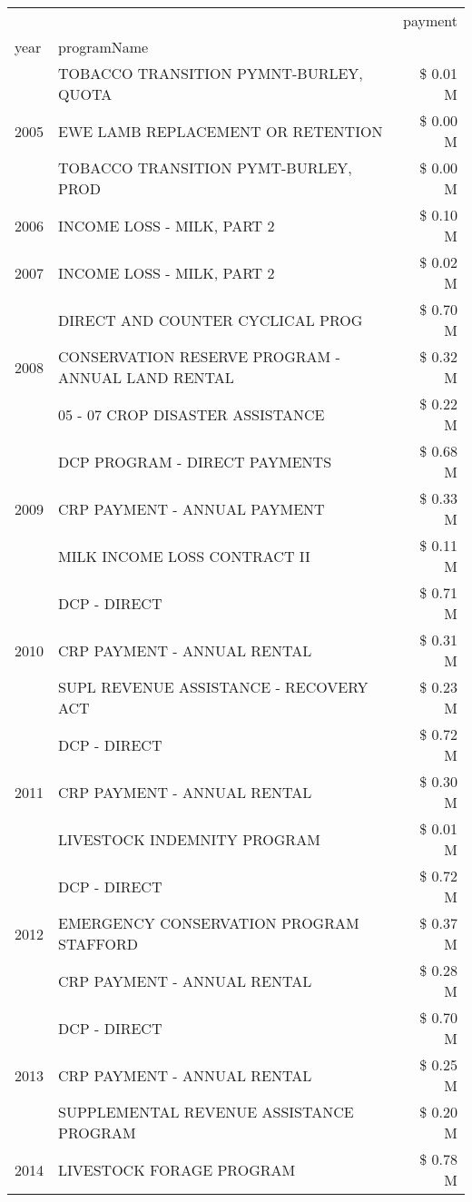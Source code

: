 \begin{tabular}{llr}
\toprule
 &  & payment \\
year & programName &  \\
\midrule
\multirow[t]{3}{*}{2005} & TOBACCO TRANSITION PYMNT-BURLEY, QUOTA & \$ 0.01 M \\
 & EWE LAMB REPLACEMENT OR RETENTION & \$ 0.00 M \\
 & TOBACCO TRANSITION PYMT-BURLEY, PROD & \$ 0.00 M \\
\cline{1-3}
2006 & INCOME LOSS - MILK, PART 2 & \$ 0.10 M \\
\cline{1-3}
2007 & INCOME LOSS - MILK, PART 2 & \$ 0.02 M \\
\cline{1-3}
\multirow[t]{3}{*}{2008} & DIRECT AND COUNTER CYCLICAL PROG & \$ 0.70 M \\
 & CONSERVATION RESERVE PROGRAM - ANNUAL LAND RENTAL & \$ 0.32 M \\
 & 05 - 07 CROP DISASTER ASSISTANCE & \$ 0.22 M \\
\cline{1-3}
\multirow[t]{3}{*}{2009} & DCP PROGRAM - DIRECT PAYMENTS & \$ 0.68 M \\
 & CRP PAYMENT - ANNUAL PAYMENT & \$ 0.33 M \\
 & MILK INCOME LOSS CONTRACT II & \$ 0.11 M \\
\cline{1-3}
\multirow[t]{3}{*}{2010} & DCP - DIRECT & \$ 0.71 M \\
 & CRP PAYMENT - ANNUAL RENTAL & \$ 0.31 M \\
 & SUPL REVENUE ASSISTANCE - RECOVERY ACT & \$ 0.23 M \\
\cline{1-3}
\multirow[t]{3}{*}{2011} & DCP - DIRECT & \$ 0.72 M \\
 & CRP PAYMENT - ANNUAL RENTAL & \$ 0.30 M \\
 & LIVESTOCK INDEMNITY PROGRAM & \$ 0.01 M \\
\cline{1-3}
\multirow[t]{3}{*}{2012} & DCP - DIRECT & \$ 0.72 M \\
 & EMERGENCY CONSERVATION PROGRAM STAFFORD & \$ 0.37 M \\
 & CRP PAYMENT - ANNUAL RENTAL & \$ 0.28 M \\
\cline{1-3}
\multirow[t]{3}{*}{2013} & DCP - DIRECT & \$ 0.70 M \\
 & CRP PAYMENT - ANNUAL RENTAL & \$ 0.25 M \\
 & SUPPLEMENTAL REVENUE ASSISTANCE PROGRAM & \$ 0.20 M \\
\cline{1-3}
\multirow[t]{3}{*}{2014} & LIVESTOCK FORAGE PROGRAM & \$ 0.78 M \\

\end{tabular}
